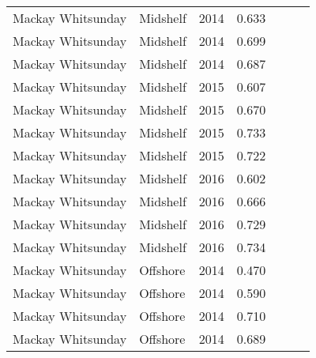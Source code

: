 {\begin{longtable}{llccccc}
  Mackay Whitsunday & Midshelf & 2014 & 0.633 & \cellcolor[HTML]{F0C918}{C} & \cellcolor[HTML]{B0D235}{B} & \cellcolor[HTML]{F0C918}{C} \\ 
  Mackay Whitsunday & Midshelf & 2014 & 0.699 & \cellcolor[HTML]{B0D235}{B} & \cellcolor[HTML]{B0D235}{B} & \cellcolor[HTML]{B0D235}{B} \\ 
  Mackay Whitsunday & Midshelf & 2014 & 0.687 & \cellcolor[HTML]{B0D235}{B} & \cellcolor[HTML]{B0D235}{B} & \cellcolor[HTML]{B0D235}{B} \\ 
  Mackay Whitsunday & Midshelf & 2015 & 0.607 & \cellcolor[HTML]{F0C918}{C} & \cellcolor[HTML]{B0D235}{B} & \cellcolor[HTML]{F0C918}{C} \\ 
  Mackay Whitsunday & Midshelf & 2015 & 0.670 & \cellcolor[HTML]{B0D235}{B} & \cellcolor[HTML]{B0D235}{B} & \cellcolor[HTML]{B0D235}{B} \\ 
  Mackay Whitsunday & Midshelf & 2015 & 0.733 & \cellcolor[HTML]{B0D235}{B} & \cellcolor[HTML]{B0D235}{B} & \cellcolor[HTML]{B0D235}{B} \\ 
  Mackay Whitsunday & Midshelf & 2015 & 0.722 & \cellcolor[HTML]{B0D235}{B} & \cellcolor[HTML]{B0D235}{B} & \cellcolor[HTML]{B0D235}{B} \\ 
  Mackay Whitsunday & Midshelf & 2016 & 0.602 & \cellcolor[HTML]{F0C918}{C} & \cellcolor[HTML]{B0D235}{B} & \cellcolor[HTML]{F0C918}{C} \\ 
  Mackay Whitsunday & Midshelf & 2016 & 0.666 & \cellcolor[HTML]{F0C918}{C} & \cellcolor[HTML]{B0D235}{B} & \cellcolor[HTML]{B0D235}{B} \\ 
  Mackay Whitsunday & Midshelf & 2016 & 0.729 & \cellcolor[HTML]{B0D235}{B} & \cellcolor[HTML]{B0D235}{B} & \cellcolor[HTML]{B0D235}{B} \\ 
  Mackay Whitsunday & Midshelf & 2016 & 0.734 & \cellcolor[HTML]{B0D235}{B} & \cellcolor[HTML]{B0D235}{B} & \cellcolor[HTML]{B0D235}{B} \\ 
  Mackay Whitsunday & Offshore & 2014 & 0.470 & \cellcolor[HTML]{F47721}{D} & \cellcolor[HTML]{F0C918}{C} & \cellcolor[HTML]{F47721}{D} \\ 
  Mackay Whitsunday & Offshore & 2014 & 0.590 & \cellcolor[HTML]{F0C918}{C} & \cellcolor[HTML]{F0C918}{C} & \cellcolor[HTML]{F0C918}{C} \\ 
  Mackay Whitsunday & Offshore & 2014 & 0.710 & \cellcolor[HTML]{B0D235}{B} & \cellcolor[HTML]{B0D235}{B} & \cellcolor[HTML]{B0D235}{B} \\ 
  Mackay Whitsunday & Offshore & 2014 & 0.689 & \cellcolor[HTML]{B0D235}{B} & \cellcolor[HTML]{B0D235}{B} & \cellcolor[HTML]{B0D235}{B} \\ 

\end{longtable}}
